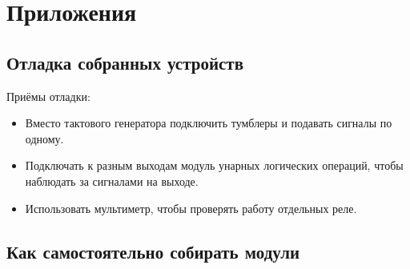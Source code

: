 \documentclass[openany]{book}
\begin{document}
\part{Приложения}

\appendix

\chapter{Отладка собранных устройств}

Приёмы отладки:
\begin{itemize}
    \item Вместо тактового генератора подключить тумблеры и подавать сигналы по одному.
    \item Подключать к разным выходам модуль унарных логических операций, чтобы наблюдать
          за сигналами на выходе.
    \item Использовать мультиметр, чтобы проверять работу отдельных реле.
\end{itemize}

\chapter{Как самостоятельно собирать модули}


\end{document}
